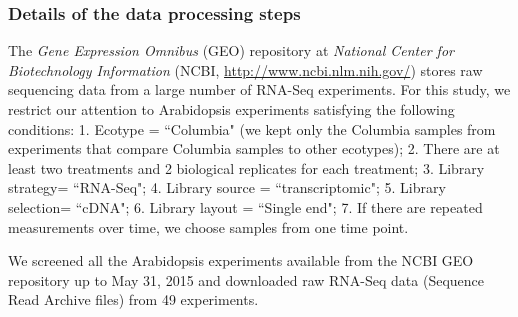 \documentclass[letterpaper,12pt]{article}
\begin{document}
\subsubsection{Details of the data processing steps}
The \textit{Gene Expression Omnibus} (GEO) repository at \textit{National
	Center for Biotechnology Information} (NCBI,
\url{http://www.ncbi.nlm.nih.gov/}) stores raw sequencing data from a large
number of RNA-Seq experiments.  For this study, we restrict our attention to
Arabidopsis experiments satisfying the following conditions: 1.  Ecotype =
``Columbia" (we kept only the Columbia samples from experiments that compare
Columbia samples to other ecotypes); 2. There are at least two treatments and 2 biological 
replicates for each
treatment; 3. Library strategy= ``RNA-Seq"; 4.
Library source = ``transcriptomic"; 5.  Library selection= ``cDNA"; 6.  Library
layout = ``Single end"; 7. If there are repeated measurements over time, we choose samples from one 
time point. 

We screened all the Arabidopsis experiments available from the NCBI
GEO repository up to May 31, 2015 and downloaded raw RNA-Seq data (Sequence Read Archive files)
from 49 experiments. %
\end{document}

